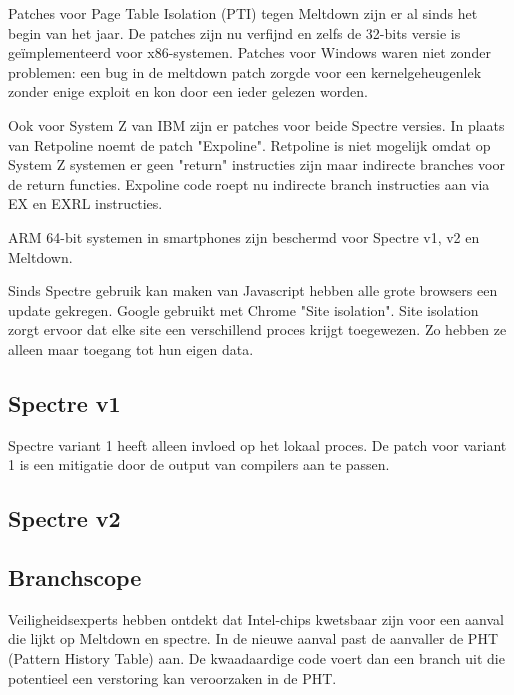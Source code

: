Patches voor Page Table Isolation (PTI) tegen Meltdown zijn er al sinds het begin van het jaar. De patches zijn nu verfijnd en zelfs de 32-bits versie is geïmplementeerd voor x86-systemen.
Patches voor Windows waren niet zonder problemen: een bug in de meltdown patch zorgde voor een kernelgeheugenlek zonder enige exploit en kon door een ieder gelezen worden.

Ook voor System Z van IBM zijn er patches voor beide Spectre versies.
In plaats van Retpoline noemt de patch "Expoline".
Retpoline is niet mogelijk omdat op System Z systemen er geen "return" instructies zijn maar indirecte branches voor de return functies. Expoline code roept nu indirecte branch instructies aan via EX en EXRL instructies.

ARM 64-bit systemen in smartphones zijn beschermd voor Spectre v1, v2 en Meltdown.

Sinds Spectre gebruik kan maken van Javascript hebben alle grote browsers een update gekregen.
Google gebruikt met Chrome "Site isolation". Site isolation zorgt ervoor dat elke site een verschillend proces krijgt toegewezen. Zo hebben ze alleen maar toegang tot hun eigen data.

\subsection{Spectre v1}
Spectre variant 1 heeft alleen invloed op het lokaal proces.
De patch voor variant 1 is een mitigatie door de output van compilers aan te passen.

\subsection{Spectre v2}

\subsection{Branchscope}
Veiligheidsexperts hebben ontdekt dat Intel-chips kwetsbaar zijn voor een aanval die lijkt op Meltdown en spectre.
In de nieuwe aanval past de aanvaller de PHT (Pattern History Table) aan.
De kwaadaardige code voert dan een branch uit die potentieel een verstoring kan veroorzaken in de PHT.

